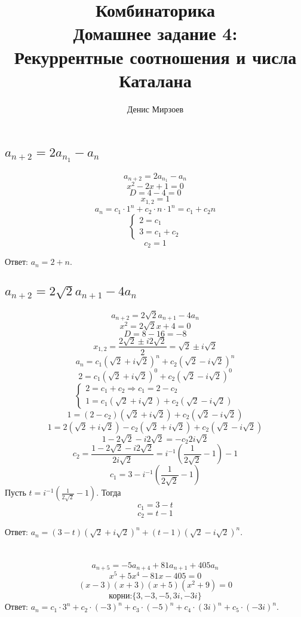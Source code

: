 \documentclass{article}
\title{Комбинаторика\\Домашнее задание 4:\\Рекуррентные соотношения и числа Каталана}
\author{Денис Мирзоев}
\date{}
\begin{document}
\maketitle

\section{}

\subsection{$a_{n+2}=2a_{n_1}-a_n$}

$$a_{n+2}=2a_{n_1}-a_n$$
$$x^2-2x+1=0$$
$$D=4-4=0$$
$$x_{1,2}=1$$
$$a_n=c_1\cdot 1^n+c_2\cdot n\cdot 1^n=c_1+c_2n$$
$$\begin{cases}
    2=c_1\\
    3=c_1+c_2
\end{cases}$$
$$c_2=1$$

Ответ: $a_n=2+n$.

\subsection{$a_{n+2}=2\sqrt{2}a_{n+1}-4a_n$}

$$a_{n+2}=2\sqrt{2}a_{n+1}-4a_n$$
$$x^2=2\sqrt{2}x+4=0$$
$$D=8-16=-8$$
$$x_{1,2}=\frac{2\sqrt{2}\pm i 2\sqrt{2}}{2}=\sqrt{2}\pm i \sqrt{2}$$
$$a_n=c_1(\sqrt{2}+i\sqrt{2})^n+c_2(\sqrt{2}-i\sqrt{2})^n$$
$$2=c_1(\sqrt{2}+i\sqrt{2})^0+c_2(\sqrt{2}-i\sqrt{2})^0$$
$$\begin{cases}
    2=c_1+c_2\Rightarrow c_1=2-c_2\\
    1=c_1(\sqrt{2}+i\sqrt{2})+c_2(\sqrt{2}-i\sqrt{2})
\end{cases}$$
$$1=(2-c_2)(\sqrt{2}+i\sqrt{2})+c_2(\sqrt{2}-i\sqrt{2})$$
$$1=2(\sqrt{2}+i\sqrt{2})-c_2(\sqrt{2}+i\sqrt{2})+c_2(\sqrt{2}-i\sqrt{2})$$
$$1-2\sqrt{2}-i2\sqrt{2}=-c_2 2i\sqrt{2}$$
$$c_2=\frac{1-2\sqrt{2}-i2\sqrt{2}}{2i\sqrt{2}}=i^{-1}(\frac{1}{2\sqrt{2}}-1)-1$$
$$c_1=3-i^{-1}(\frac{1}{2\sqrt{2}}-1)$$
Пусть $t=i^{-1}(\frac{1}{2\sqrt{2}}-1)$. Тогда
$$c_1=3-t$$
$$c_2=t-1$$

Ответ: $a_n=(3-t)(\sqrt{2}+i\sqrt{2})^n+(t-1)(\sqrt{2}-i\sqrt{2})^n$.

\section{}

$$a_{n+5}=-5a_{n+4}+81a_{n+1}+405a_n$$
$$x^5+5x^4-81x-405=0$$
$$(x-3)(x+3)(x+5)(x^2+9)=0$$
$$\text{корни:}\{3,-3,-5,3i,-3i\}$$
Ответ: $a_n=c_1\cdot 3^n+c_2\cdot (-3)^n+c_3\cdot (-5)^n+c_4\cdot(3i)^n+c_5\cdot(-3i)^n$.
\end{document}
